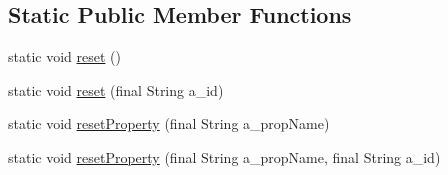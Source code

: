 \subsection*{Static Public Member Functions}
\begin{DoxyCompactItemize}
\item 
static void \hyperlink{classorg_1_1jgap_1_1_configuration_a93be0fd9c9ed1e7097e81588a1f45439}{reset} ()
\item 
static void \hyperlink{classorg_1_1jgap_1_1_configuration_ab90d40c5126610a4395d26d7c02d34f8}{reset} (final String a\-\_\-id)
\item 
static void \hyperlink{classorg_1_1jgap_1_1_configuration_a40f7aa56a73e911cac6b040d5d734cfc}{reset\-Property} (final String a\-\_\-prop\-Name)
\item 
static void \hyperlink{classorg_1_1jgap_1_1_configuration_a3f73791f89a09c3dc9410c264a2797f1}{reset\-Property} (final String a\-\_\-prop\-Name, final String a\-\_\-id)
\end{DoxyCompactItemize}
